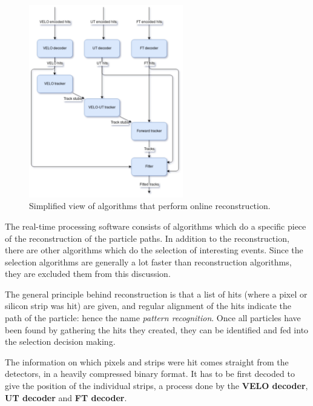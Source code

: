 \documentclass[12pt]{article}
\begin{document}
\begin{figure}[H]
	\begin{center}
		\includegraphics[width=0.6\textwidth]{algorithms_brunel}
	\end{center}
	\caption{Simplified view of algorithms that perform online reconstruction.}
	\label{fig_algorithms_brunel}
\end{figure}

The real-time processing software consists of algorithms which do a specific piece of the reconstruction of the particle paths. In addition to the reconstruction, there are other algorithms which do the selection of interesting events. Since the selection algorithms are generally a lot faster than reconstruction algorithms, they are excluded them from this discussion.

The general principle behind reconstruction is that a list of hits (where a pixel or silicon strip was hit) are given, and regular alignment of the hits indicate the path of the particle: hence the name \textit{pattern recognition}. Once all particles have been found by gathering the hits they created, they can be identified and fed into the selection decision making.

The information on which pixels and strips were hit comes straight from the detectors, in a heavily compressed binary format. It has to be first decoded to give the position of the individual strips, a process done by the \textbf{VELO decoder}, \textbf{UT decoder} and \textbf{FT decoder}.
\end{document}
